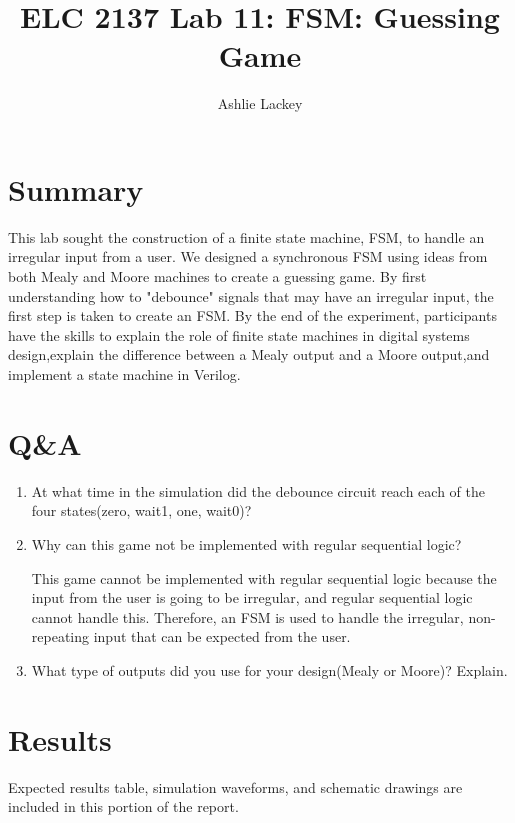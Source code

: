\documentclass[11pt]{article}
\begin{document}
\title{ELC 2137 Lab 11: FSM: Guessing Game}
\author{Ashlie Lackey}

\maketitle


\section*{Summary}
This lab sought the construction of a finite state machine, FSM, to handle an irregular input from a user. We designed a synchronous FSM using ideas from both Mealy and Moore machines to create a guessing game. By first understanding how to "debounce" signals that may have an irregular input, the first step is taken to create an FSM. By the end of the experiment, participants have the skills to explain the role of finite state machines in digital systems design,explain the difference between a Mealy output and a Moore output,and implement a state machine in Verilog.

\section*{Q\&A}
\begin{enumerate}
  \item At what time in the simulation did the debounce circuit reach each of the four states(zero, wait1, one, wait0)?
  
  
  \item Why can this game not be implemented with regular sequential logic?
  
  This game cannot be implemented with regular sequential logic because the input from the user is going to be irregular, and regular sequential logic cannot handle this. Therefore, an FSM is used to handle the irregular, non-repeating input that can be expected from the user.
  
  \item What type of outputs did you use for your design(Mealy or Moore)? Explain.
  

\end{enumerate}

\section*{Results}
  
Expected results table, simulation waveforms, and schematic drawings are included in this portion of the report.
\end{document}
